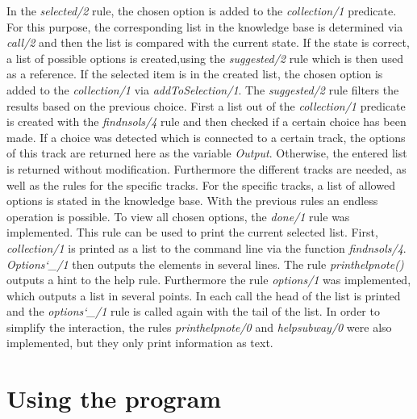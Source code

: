 \documentclass{article}
\begin{document}
	In the \textit{selected/2} rule, the chosen option is added to the \textit{collection/1} predicate. For this purpose, the corresponding list in the knowledge base is determined via \textit{call/2} and then the list is compared with  the current state. If the state is correct, a list of possible options is created,using the \textit{suggested/2} rule which is then used as a reference. If the selected item is in the created list, the chosen option is added to the \textit{collection/1} via \textit{addToSelection/1}. The \textit{suggested/2} rule filters the results based on the previous choice. First a list out of the \textit{collection/1} predicate is created with the \textit{findnsols/4} rule and then checked if a certain choice has been made. If a choice was detected which is connected to a certain track, the options of this track are returned here as the variable \textit{Output}. Otherwise, the entered list is returned without modification. Furthermore the different tracks are needed, as well as the rules for the specific tracks. For the specific tracks, a list of allowed options is stated in the knowledge base. With the previous rules an endless operation is possible. To view all chosen options, the \textit{done/1} rule was implemented. This rule can be used to print the current selected list. First, \textit{collection/1} is printed as a list to the command line via the function \textit{findnsols/4}. \textit{Options\char`_/1} then outputs the elements in several lines. The rule \textit{printhelpnote()} outputs a hint to the help rule. Furthermore the rule \textit{options/1} was implemented, which outputs a list in several points. In each call the head of the list is printed and the \textit{options\char`_/1} rule is called again with the tail of the list. 
	In order to simplify the interaction, the rules \textit{printhelpnote/0} and \textit{helpsubway/0} were also 	implemented, but they only print information as text.
	
	
	
	\section{Using the program}
	
\end{document}
